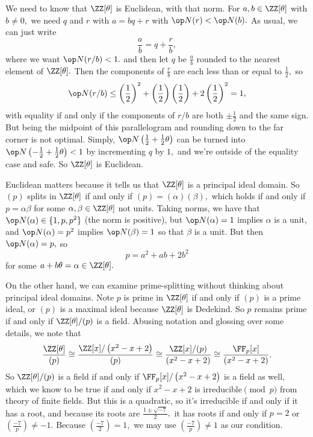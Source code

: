 We need to know that $\ZZ[\theta]$ is Euclidean, with that norm. For $a,b\in\ZZ[\theta]$ with $b\ne0,$ we need $q$ and $r$ with $a=bq+r$ with $\op N(r)<\op N(b).$ As usual, we can just write
\[\frac ab=q+\frac rb,\]
where we want $\op N(r/b)<1.$ and then let $q$ be $\frac ab$ rounded to the nearest element of $\ZZ[\theta].$ Then the components of $\frac rb$ are each less than or equal to $\frac12,$ so
\[\op N(r/b)\le\left(\frac12\right)^2+\left(\frac12\right)\left(\frac12\right)+2\left(\frac12\right)^2=1,\]
with equality if and only if the components of $r/b$ are both $\pm\frac12$ and the same sign. But being the midpoint of this parallelogram and rounding down to the far corner is not optimal. Simply, $\op N\left(\frac12+\frac12\theta\right)$ can be turned into $\op N\left(-\frac12+\frac12\theta\right)<1$ by incrementing $q$ by $1,$ and we're outside of the equality case and safe. So $\ZZ[\theta]$ is Euclidean.

Euclidean matters because it tells us that $\ZZ[\theta]$ is a principal ideal domain. So $(p)$ splits in $\ZZ[\theta]$ if and only if $(p)=(\alpha)(\beta),$ which holds if and only if $p=\alpha\beta$ for some $\alpha,\beta\in\ZZ[\theta]$ not units. Taking norms, we have that $\op N(\alpha)\in\{1,p,p^2\}$ (the norm is positive), but $\op N(\alpha)=1$ implies $\alpha$ is a unit, and $\op N(\alpha)=p^2$ implies $\op N(\beta)=1$ so that $\beta$ is a unit. But then $\op N(\alpha)=p,$ so
\[p=a^2+ab+2b^2\]
for some $a+b\theta=\alpha\in\ZZ[\theta].$

On the other hand, we can examine prime-splitting without thinking about principal ideal domains. Note $p$ is prime in $\ZZ[\theta]$ if and only if $(p)$ is a prime ideal, or $(p)$ is a maximal ideal because $\ZZ[\theta]$ is Dedekind. So $p$ remains prime if and only if $\ZZ[\theta]/(p)$ is a field. Abusing notation and glossing over some details, we note that
\[\frac{\ZZ[\theta]}{(p)}\cong\frac{\ZZ[x]/\left(x^2-x+2\right)}{(p)}\cong\frac{\ZZ[x]/(p)}{\left(x^2-x+2\right)}\cong\frac{\FF_p[x]}{\left(x^2-x+2\right)}.\]
So $\ZZ[\theta]/(p)$ is a field if and only if $\FF_p[x]/\left(x^2-x+2\right)$ is a field as well, which we know to be true if and only if $x^2-x+2$ is irreducible$\pmod p$ from theory of finite fields. But this is a quadratic, so it's irreducible if and only if it has a root, and because its roots are $\frac{1\pm\sqrt{-7}}2,$ it has roots if and only if $p=2$ or $\left(\frac{-7}p\right)\ne-1.$ Because $\left(\frac{-7}2\right)=1,$ we may use $\left(\frac{-7}p\right)\ne1$ as our condition.


